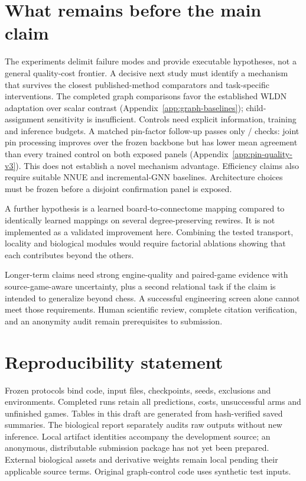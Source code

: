 \documentclass{article}
\begin{document}
\section{What remains before the main claim}
The experiments delimit failure modes and provide executable hypotheses, not a
general quality-cost frontier. A decisive next study must identify a mechanism
that survives the closest published-method comparators and task-specific
interventions. The completed graph comparisons favor the established WLDN
adaptation over scalar contrast (Appendix~\ref{app:graph-baselines}); child-assignment
sensitivity is insufficient. Controls need
explicit information, training and inference budgets. A matched pin-factor
follow-up passes only \PinQualityChecksPassed{}/\PinQualityChecksTotal{} checks:
joint pin processing improves over the frozen backbone but has lower mean
agreement than every trained control on both exposed panels
(Appendix~\ref{app:pin-quality-v3}). This does not establish a novel mechanism
advantage. Efficiency claims also
require suitable NNUE and incremental-GNN baselines. Architecture choices must
be frozen before a disjoint confirmation panel is exposed.

A further hypothesis is a learned board-to-connectome mapping compared to
identically learned mappings on several degree-preserving rewires. It is not
implemented as a validated improvement here. Combining the tested transport,
locality and biological modules would require factorial ablations showing that
each contributes beyond the others.

Longer-term claims need strong engine-quality and paired-game evidence with
source-game-aware uncertainty, plus a second relational task if the claim is
intended to generalize beyond chess. A successful engineering screen alone
cannot meet those requirements. Human scientific review, complete citation
verification, and an anonymity audit remain prerequisites to submission.

\section*{Reproducibility statement}
Frozen protocols bind code, input files, checkpoints, seeds, exclusions and
environments. Completed runs retain all predictions, costs, unsuccessful arms
and unfinished games. Tables in this draft are generated from hash-verified
saved summaries. The biological report separately audits raw outputs without
new inference. Local artifact identities accompany the development source;
an anonymous, distributable submission package has not yet been prepared.
External biological assets and derivative weights remain local pending their
applicable source terms. Original graph-control code uses synthetic test inputs.
\end{document}
